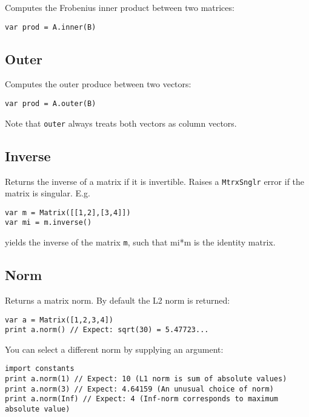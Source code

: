 Computes the Frobenius inner product between two matrices:

\begin{lstlisting}
var prod = A.inner(B)
\end{lstlisting}

\hypertarget{outer}{%
\subsection{Outer}\label{outer}}

Computes the outer produce between two vectors:

\begin{lstlisting}
var prod = A.outer(B)
\end{lstlisting}

Note that \texttt{outer} always treats both vectors as column vectors.

\hypertarget{inverse}{%
\subsection{Inverse}\label{inverse}}

Returns the inverse of a matrix if it is invertible. Raises a
\texttt{MtrxSnglr} error if the matrix is singular. E.g.

\begin{lstlisting}
var m = Matrix([[1,2],[3,4]])
var mi = m.inverse()
\end{lstlisting}

yields the inverse of the matrix \texttt{m}, such that mi*m is the
identity matrix.

\hypertarget{norm}{%
\subsection{Norm}\label{norm}}

Returns a matrix norm. By default the L2 norm is returned:

\begin{lstlisting}
var a = Matrix([1,2,3,4])
print a.norm() // Expect: sqrt(30) = 5.47723...
\end{lstlisting}

You can select a different norm by supplying an argument:

\begin{lstlisting}
import constants
print a.norm(1) // Expect: 10 (L1 norm is sum of absolute values) 
print a.norm(3) // Expect: 4.64159 (An unusual choice of norm)
print a.norm(Inf) // Expect: 4 (Inf-norm corresponds to maximum absolute value)
\end{lstlisting}

